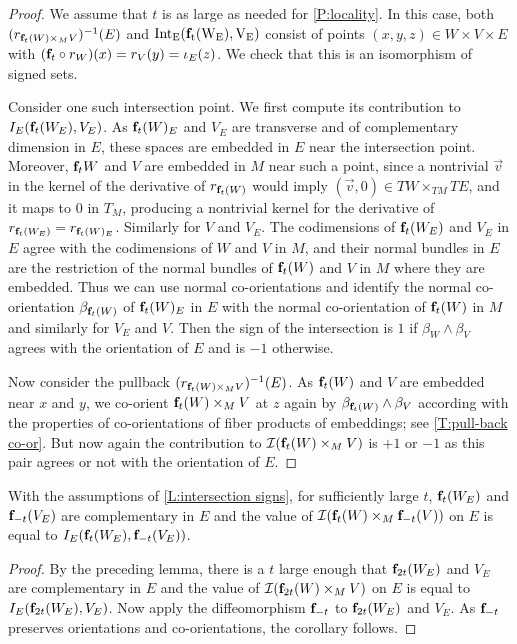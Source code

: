 \begin{proof}
	We assume that $t$ is as large as needed for \cref{P:locality}.
	In this case, both $(r_{\mathbf{f}_t(W) \times_M V})^{-1}(E)$ and $\rm{Int}_E(\mathbf{f}_t(W_E), V_E)$ consist of points $(x,y,z) \in W \times V \times E$ with $(\mathbf{f}_t \circ r_W)(x) = r_V (y) = \iota_E(z)$.
	We check that this is an isomorphism of signed sets.

	Consider one such intersection point.
	We first compute its contribution to $I_E(\mathbf{f}_t(W_E), V_E)$.
	As $\mathbf{f}_t(W)_E$ and $V_E$ are transverse and of complementary dimension in $E$, these spaces are embedded in $E$ near the intersection point.
	Moreover, $\mathbf{f}_t W$ and $V$ are embedded in $M$ near such a point, since a nontrivial $\vec v$ in the kernel of the derivative of $r_{\mathbf{f}_t (W)}$ would imply $(\vec v,0)\in TW\times_{TM} TE$, and it maps to $0$ in $T_M$, producing a nontrivial kernel for the derivative of $r_{\mathbf{f}_t(W_E)}=r_{\mathbf{f}_t(W)_E}$.
	Similarly for $V$ and $V_E$.
	The codimensions of $\mathbf{f}_t (W_E)$ and $V_E$ in $E$ agree with the codimensions of $W$ and $V$ in $M$, and their normal bundles in $E$ are the restriction of the normal bundles of $\mathbf{f}_t(W)$ and $V$ in $M$ where they are embedded.
	Thus we can use normal co-orientations and identify the normal co-orientation $\beta_{\mathbf{f}_t(W)}$ of $\mathbf{f}_t(W)_E$ in $E$ with the normal co-orientation of $\mathbf{f}_t(W)$ in $M$ and similarly for $V_E$ and $V$.
	Then the sign of the intersection is $1$ if $\beta_W \wedge \beta_V$ agrees with the orientation of $E$ and is $-1$ otherwise.

	Now consider the pullback $(r_{\mathbf{f}_t(W) \times_M V})^{-1}(E)$.
	As $\mathbf{f}_t( W)$ and $V$ are embedded near $x$ and $y$, we co-orient $\mathbf{f}_t(W) \times_M V$ at $z$ again by $\beta_{\mathbf{f}_t(W)} \wedge \beta_V$ according with the properties of co-orientations of fiber products of embeddings; see \cref{T:pull-back co-or}.
	But now again the contribution to $\mathcal{I}(\mathbf{f}_t(W) \times_M V)$ is $+1$ or $-1$ as this pair agrees or not with the orientation of $E$.
\end{proof}

\begin{corollary}\label{C:intersection signs}
	With the assumptions of \cref{L:intersection signs}, for sufficiently large $t$, $\mathbf{f}_t(W_E)$ and $\mathbf{f}_{-t}(V_E)$ are complementary in $E$ and the value of $\mathcal{I}(\mathbf{f}_t(W) \times_M \mathbf{f}_{-t}(V))$ on $E$ is equal to $I_E(\mathbf{f}_t(W_E), \mathbf{f}_{-t}(V_E))$.
\end{corollary}

\begin{proof}
	By the preceding lemma, there is a $t$ large enough that $\mathbf{f}_{2t}(W_E)$ and $V_E$ are complementary in $E$ and the value of $\mathcal{I}(\mathbf{f}_{2t}(W) \times_M V)$ on $E$ is equal to $I_E(\mathbf{f}_{2t}(W_E), V_E)$.
	Now apply the diffeomorphism $\mathbf{f}_{-t}$ to $\mathbf{f}_{2t}(W_E)$ and $V_E$.
	As $\mathbf{f}_{-t}$ preserves orientations and co-orientations, the corollary follows.
\end{proof}

